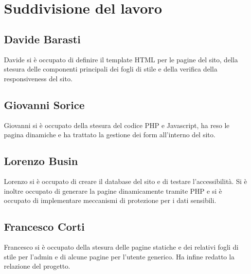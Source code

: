\section{Suddivisione del lavoro}

\subsection{Davide Barasti}
Davide si è occupato di definire il template HTML per le pagine del sito, della stesura delle componenti principali dei fogli di stile e della verifica della responsiveness del sito.

\subsection{Giovanni Sorice}
Giovanni si è occupato della stesura del codice PHP e Javascript, ha reso le pagina dinamiche e ha trattato la gestione dei form all'interno del sito.

\subsection{Lorenzo Busin}
Lorenzo si è occupato di creare il database del sito e di testare l'accessibilità. Si è inoltre occupato di generare la pagine dinamicamente tramite PHP e si è occupato di implementare meccanismi di protezione per i dati sensibili.

\subsection{Francesco Corti}
Francesco si è occupato della stesura delle pagine statiche e dei relativi fogli di stile per l'admin e di alcune pagine per l'utente generico. Ha infine redatto la relazione del progetto. 